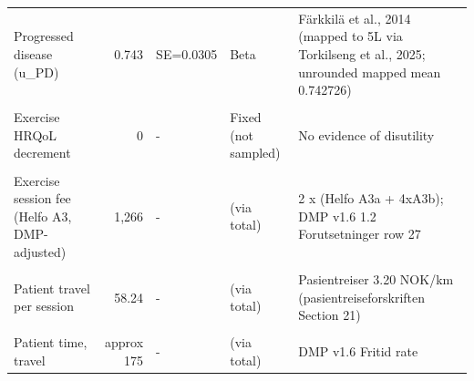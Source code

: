 \begin{ThreePartTable}
\begin{longtable}[t]{lr>{\raggedright\arraybackslash}p{3.7cm}>{\raggedright\arraybackslash}p{3.6cm}>{\raggedright\arraybackslash}p{5.2cm}}
\textcolor[HTML]{2D3748}{Progressed disease (u\_PD)} & \textcolor[HTML]{2D3748}{0.743} & \textcolor[HTML]{2D3748}{SE=0.0305} & \textcolor[HTML]{2D3748}{Beta} & \textcolor[HTML]{2D3748}{Färkkilä et al., 2014 (mapped to 5L via Torkilseng et al., 2025; unrounded mapped mean 0.742726)}\\
\cellcolor[HTML]{F7F9FC}{\textcolor[HTML]{2D3748}{Dead}} & \cellcolor[HTML]{F7F9FC}{\textcolor[HTML]{2D3748}{0}} & \cellcolor[HTML]{F7F9FC}{\textcolor[HTML]{2D3748}{-}} & \cellcolor[HTML]{F7F9FC}{\textcolor[HTML]{2D3748}{Fixed}} & \cellcolor[HTML]{F7F9FC}{\textcolor[HTML]{2D3748}{By definition}}\\
\textcolor[HTML]{2D3748}{Exercise HRQoL decrement} & \textcolor[HTML]{2D3748}{0} & \textcolor[HTML]{2D3748}{-} & \textcolor[HTML]{2D3748}{Fixed (not sampled)} & \textcolor[HTML]{2D3748}{No evidence of disutility}\\
\cellcolor[HTML]{F7F9FC}{\textcolor[HTML]{2D3748}{COST PARAMETERS}} & \cellcolor[HTML]{F7F9FC}{\textcolor[HTML]{2D3748}{}} & \cellcolor[HTML]{F7F9FC}{\textcolor[HTML]{2D3748}{}} & \cellcolor[HTML]{F7F9FC}{\textcolor[HTML]{2D3748}{}} & \cellcolor[HTML]{F7F9FC}{\textcolor[HTML]{2D3748}{}}\\
\textcolor[HTML]{2D3748}{Exercise session fee (Helfo A3, DMP-adjusted)} & \textcolor[HTML]{2D3748}{1,266} & \textcolor[HTML]{2D3748}{-} & \textcolor[HTML]{2D3748}{(via total)} & \textcolor[HTML]{2D3748}{2 x (Helfo A3a + 4xA3b); DMP v1.6 1.2 Forutsetninger row 27}\\
\cellcolor[HTML]{F7F9FC}{\textcolor[HTML]{2D3748}{Initial assessment (Helfo A1d)}} & \cellcolor[HTML]{F7F9FC}{\textcolor[HTML]{2D3748}{516}} & \cellcolor[HTML]{F7F9FC}{\textcolor[HTML]{2D3748}{SE=103}} & \cellcolor[HTML]{F7F9FC}{\textcolor[HTML]{2D3748}{Gamma}} & \cellcolor[HTML]{F7F9FC}{\textcolor[HTML]{2D3748}{Helfo A1d}}\\
\textcolor[HTML]{2D3748}{Patient travel per session} & \textcolor[HTML]{2D3748}{58.24} & \textcolor[HTML]{2D3748}{-} & \textcolor[HTML]{2D3748}{(via total)} & \textcolor[HTML]{2D3748}{Pasientreiser 3.20 NOK/km (pasientreiseforskriften Section 21)}\\
\cellcolor[HTML]{F7F9FC}{\textcolor[HTML]{2D3748}{Patient time, exercise}} & \cellcolor[HTML]{F7F9FC}{\textcolor[HTML]{2D3748}{328}} & \cellcolor[HTML]{F7F9FC}{\textcolor[HTML]{2D3748}{-}} & \cellcolor[HTML]{F7F9FC}{\textcolor[HTML]{2D3748}{(via total)}} & \cellcolor[HTML]{F7F9FC}{\textcolor[HTML]{2D3748}{DMP v1.6 Fritid rate}}\\
\textcolor[HTML]{2D3748}{Patient time, travel} & \textcolor[HTML]{2D3748}{approx 175} & \textcolor[HTML]{2D3748}{-} & \textcolor[HTML]{2D3748}{(via total)} & \textcolor[HTML]{2D3748}{DMP v1.6 Fritid rate}\\

\end{longtable}
\end{ThreePartTable}
